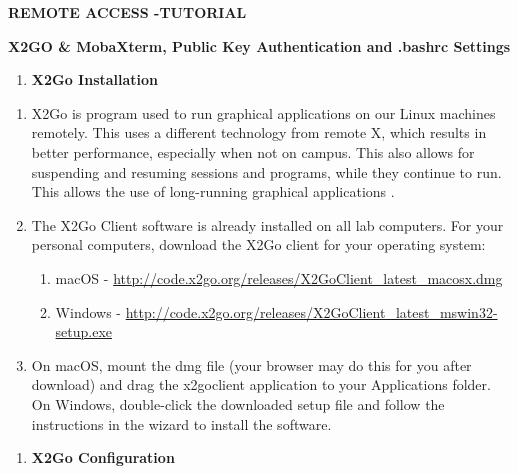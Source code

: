 \documentclass{article}
\begin{document}
\maketitle

\author{}
\date{}

\textbf{REMOTE ACCESS -TUTORIAL}

\textbf{X2GO \& MobaXterm, Public Key Authentication and .bashrc
Settings}

\begin{enumerate}
\def\labelenumi{\Alph{enumi}.}
\item
  \textbf{X2Go Installation}
\end{enumerate}

\begin{enumerate}
\def\labelenumi{\arabic{enumi}.}
\item
  X2Go is program used to run graphical applications on our Linux
  machines remotely. This uses a different technology from remote X,
  which results in better performance, especially when not on campus.
  This also allows for suspending and resuming sessions and programs,
  while they continue to run. This allows the use of long-running
  graphical applications \cite{Cai2014}.
\item
  The X2Go Client software is already installed on all lab computers.
  For your personal computers, download the X2Go client for your
  operating system:

  \begin{enumerate}
  \def\labelenumii{\arabic{enumii}.}
  \item
    macOS -
    \url{http://code.x2go.org/releases/X2GoClient_latest_macosx.dmg}
  \item
    Windows -
    \url{http://code.x2go.org/releases/X2GoClient_latest_mswin32-setup.exe}
  \end{enumerate}
\item
  On macOS, mount the dmg file (your browser may do this for you after
  download) and drag the x2goclient application to your Applications
  folder. On Windows, double-click the downloaded setup file and follow
  the instructions in the wizard to install the software.
\end{enumerate}

\begin{enumerate}
\def\labelenumi{\Alph{enumi}.}
\setcounter{enumi}{1}
\item
  \textbf{X2Go Configuration}
\end{enumerate}
\end{document}
